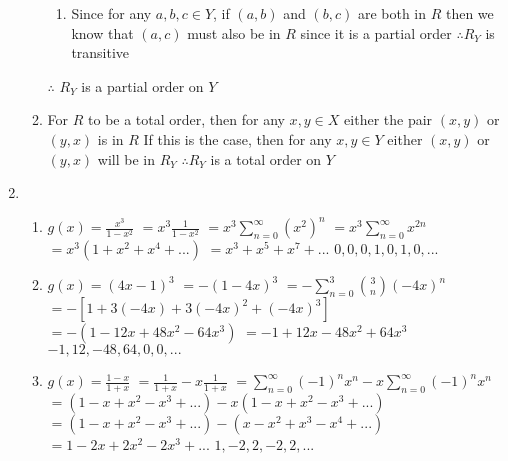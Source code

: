 \documentclass{article}
\begin{document}
\begin{enumerate}
\begin{enumerate}
\begin{enumerate}
				\item Since for any $a,b,c\in Y$, if $(a,b)$ and $(b,c)$ are both in $R$ then we know that $(a,c)$ must also be in $R$ since it is a partial order
				\newline $\therefore R_Y$ is transitive
			\end{enumerate}
			$\therefore$ $R_Y$ is a partial order on $Y$
			
			\newpage
			\item For $R$ to be a total order, then for any $x,y\in X$ either the pair $(x,y)$ or $(y,x)$ is in $R$
			\newline If this is the case, then for any $x,y\in Y$ either $(x,y)$ or $(y,x)$ will be in $R_Y$
			\newline $\therefore R_Y$ is a total order on $Y$
		\end{enumerate}
	
		\item
		\begin{enumerate}
			\item $g(x)=\frac{x^3}{1-x^2}$
			\newline $=x^3\frac{1}{1-x^2}$
			\newline $=x^3\sum\limits_{n=0}^{\infty}(x^2)^n$
			\newline $=x^3\sum\limits_{n=0}^{\infty}x^{2n}$
			\newline $=x^3(1+x^2+x^4+...)$
			\newline $=x^3+x^5+x^7+...$
			\newline $0,0,0,1,0,1,0,...$
			
			\item $g(x)=(4x-1)^3$
			\newline $=-(1-4x)^3$
			\newline $=-\sum\limits_{n=0}^{3}{{3}\choose{n}}(-4x)^n$
			\newline $=-[1+3(-4x)+3(-4x)^2+(-4x)^3]$
			\newline $=-(1-12x+48x^2-64x^3)$
			\newline $=-1+12x-48x^2+64x^3$
			\newline $-1,12,-48,64,0,0,...$
			
			\item $g(x)=\frac{1-x}{1+x}$
			\newline $=\frac{1}{1+x}-x\frac{1}{1+x}$
			\newline $=\sum\limits_{n=0}^{\infty}(-1)^nx^n-x\sum\limits_{n=0}^{\infty}(-1)^nx^n$
			\newline $=(1-x+x^2-x^3+...)-x(1-x+x^2-x^3+...)$
			\newline $=(1-x+x^2-x^3+...)-(x-x^2+x^3-x^4+...)$
			\newline $=1-2x+2x^2-2x^3+...$
			\newline $1,-2,2,-2,2,...$
		\end{enumerate}
	

\end{enumerate}
\end{document}

